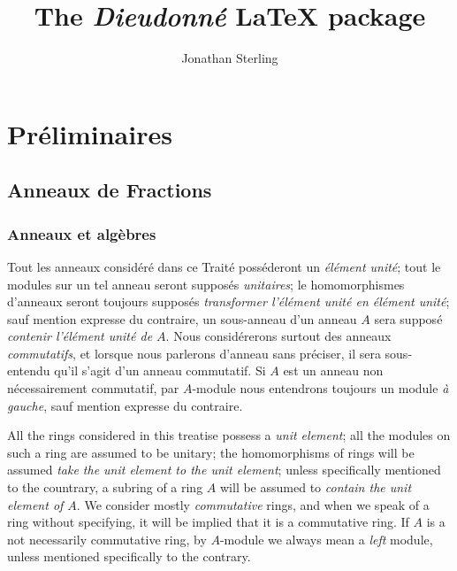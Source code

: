 \documentclass[french]{ega}
\title{The \emph{Dieudonné} \LaTeX{} package}
\author{Jonathan Sterling}
\begin{document}
\maketitle

\tableofcontents*

\mainmatter
{}
\chapter{Préliminaires}

\section{Anneaux de Fractions}

\subsection{Anneaux et algèbres}

\vspace{-1em}
\begin{minipage}[t]{0.5\textwidth}
  \begin{node}
    Tout les anneaux considéré dans ce Traité posséderont un
    \emph{élément unité}; tout le modules sur un tel anneau seront
    supposés \emph{unitaires}; le homomorphismes d'anneaux seront toujours
    supposés \emph{transformer l'élément unité en élément unité};
    sauf mention expresse du contraire, un sous-anneau d'un anneau \(A\) sera
    supposé \emph{contenir l'élément unité de \(A\)}. Nous considérerons
    surtout des anneaux \emph{commutatifs}, et lorsque nous parlerons  d'anneau
    sans préciser, il sera sous-entendu qu'il s'agit d'un anneau commutatif. Si
    \(A\) est un anneau non nécessairement commutatif, par \(A\)-module nous
    entendrons toujours un module \emph{à gauche}, sauf mention expresse du
    contraire.
  \end{node}
\end{minipage}
\quad
\begin{minipage}[t]{0.5\textwidth}
  \addtocounter{node}{-1}
  
  \begin{node}
    All the rings considered in this treatise possess a \emph{unit element};
    all the modules on such a ring are assumed to be unitary; the homomorphisms
    of rings will be assumed \emph{take the unit element to the unit element};
    unless specifically mentioned to the countrary, a subring of a ring \(A\)
    will be assumed to \emph{contain the unit element of \(A\)}. We consider
    mostly \emph{commutative} rings, and when we speak of a ring without
    specifying, it will be implied that  it is a commutative ring. If \(A\) is a
    not necessarily commutative ring, by \(A\)-module we always mean a
    \emph{left} module, unless mentioned specifically to the contrary.
  \end{node}

\end{minipage}
\medskip
\end{document}
